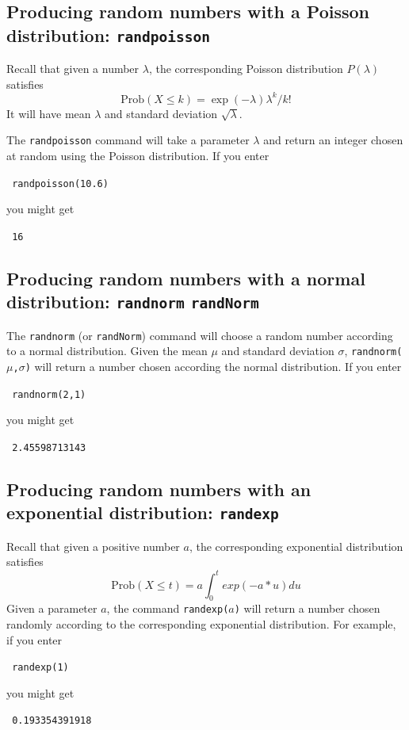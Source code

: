 \documentclass[a4paper,11pt]{book}
\begin{document}
\subsection{Producing random numbers with a Poisson distribution: \texttt{randpoisson}}

Recall that given a number $\lambda$, the corresponding Poisson
distribution $P(\lambda)$ satisfies
\[ \text{Prob}(X \le k) = \exp(-\lambda)\lambda^k/k!\]
It will have mean $\lambda$ and standard deviation $\sqrt{\lambda}$.

The \texttt{randpoisson} command will take a parameter $\lambda$ and
return an integer chosen at random using the Poisson distribution.
If you enter
\begin{center}
  \tt
  randpoisson(10.6)
\end{center}
you might get
\begin{center}
  \tt
  16
\end{center}

\subsection{Producing random numbers with a normal distribution: \texttt{randnorm} \texttt{randNorm}}

The \texttt{randnorm} (or \texttt{randNorm}) command will choose a
random number according to a normal distribution.  Given the mean
$\mu$ and standard deviation $\sigma$,
\texttt{randnorm($\mu$,$\sigma$)} will return a number chosen
according the normal distribution.  If you enter
\begin{center}
  \tt
  randnorm(2,1)
\end{center}
you might get
\begin{center}
  \tt
  2.45598713143
\end{center}

\subsection{Producing random numbers with an exponential distribution: \texttt{randexp}}

Recall that given a positive number $a$, the corresponding exponential
distribution satisfies
\[ \text{Prob}(X \le t) = a \int_0^t exp(-a * u) du\]
Given a parameter $a$, the command \texttt{randexp($a$)} will return a
number chosen randomly according to the corresponding exponential
distribution.  For example, if you enter
\begin{center}
  \tt
  randexp(1)
\end{center}
you might get
\begin{center}
  \tt
  0.193354391918
\end{center}
\end{document}
